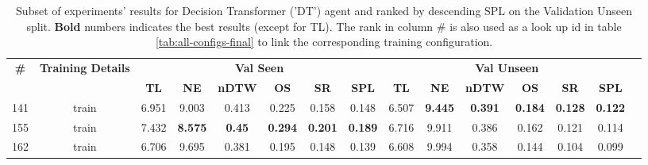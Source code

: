 \begin{table}
\centering
\caption{\label{tab:dt_normalized_visual_features}Subset of experiments' results for Decision Transformer ('DT') agent and ranked by descending SPL on the Validation Unseen split. \textbf{Bold} numbers indicates the best results (except for TL). The rank in column \# is also used as a look up id in table \ref{tab:all-configs-final} to link the corresponding training configuration.}
\begin{tabular}{@{\hskip3pt}c@{\hskip3pt}c@{\hskip3pt}c@{\hskip3pt}c@{\hskip3pt}c@{\hskip3pt}c@{\hskip3pt}c@{\hskip3pt}c@{\hskip3pt}c@{\hskip3pt}c@{\hskip3pt}c@{\hskip3pt}c@{\hskip3pt}c@{\hskip3pt}c@{\hskip3pt}c}
\toprule
                                  \textbf{\#} & \textbf{Training Details} & \multicolumn{6}{c}{\textbf{Val Seen}} & \multicolumn{6}{c}{\textbf{Val Unseen}} \\
\cmidrule(l){3-8}\cmidrule(l){9-14}\textbf{~} &                \textbf{~} &       \textbf{TL} &     \textbf{NE} &  \textbf{nDTW} &     \textbf{OS} &     \textbf{SR} &    \textbf{SPL} &         \textbf{TL} &     \textbf{NE} &   \textbf{nDTW} &     \textbf{OS} &     \textbf{SR} &    \textbf{SPL} \\
\midrule
                                          141 &                     train &             6.951 &           9.003 &          0.413 &           0.225 &           0.158 &           0.148 &               6.507 &  \textbf{9.445} &  \textbf{0.391} &  \textbf{0.184} &  \textbf{0.128} &  \textbf{0.122} \\
                                          155 &                     train &             7.432 &  \textbf{8.575} &  \textbf{0.45} &  \textbf{0.294} &  \textbf{0.201} &  \textbf{0.189} &               6.716 &           9.911 &           0.386 &           0.162 &           0.121 &           0.114 \\
                                          162 &                     train &             6.706 &           9.695 &          0.381 &           0.195 &           0.148 &           0.139 &               6.608 &           9.994 &           0.358 &           0.144 &           0.104 &           0.099 \\
\bottomrule
\end{tabular}
\end{table}
